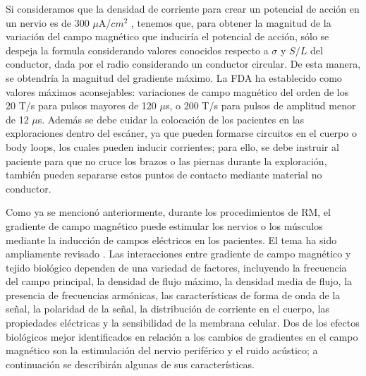 Si consideramos que la densidad de corriente para crear un potencial de acción en un nervio es de 300 $\mu$A/$cm^2$ \cite{Budinger_1983}, tenemos que, para obtener la magnitud de la variación del campo magnético que induciría el potencial de acción, sólo se despeja la formula considerando valores conocidos respecto a $\sigma$ y $S/L$ del conductor, dada por el radio considerando un conductor circular. De esta manera, se obtendría la magnitud del gradiente máximo. La FDA ha establecido como valores máximos aconsejables: variaciones de campo magnético del orden de los 20 T/s para pulsos mayores de 120 $\mu$s, o 200 T/s para pulsos de amplitud menor de 12 $\mu$s. Además se debe cuidar la colocación de los pacientes en las exploraciones dentro del escáner, ya que pueden formarse circuitos en el cuerpo o body loops, los cuales pueden inducir corrientes; para ello, se debe instruir al paciente para que no cruce los brazos o las piernas durante la exploración, también pueden separarse estos puntos de contacto mediante material no conductor.

Como ya se mencionó anteriormente, durante los procedimientos de RM, el gradiente de campo magnético puede estimular los nervios o los músculos mediante la inducción de campos eléctricos en los pacientes. El tema ha sido ampliamente revisado \cite{Nyenhuis_Bourland_Schaefer_1997,Bourland_Nyenhuis_Schaefer_1999}. Las interacciones entre gradiente de campo magnético y tejido biológico dependen de una variedad de factores, incluyendo la frecuencia del campo principal, la densidad de flujo máximo, la densidad media de flujo, la presencia de frecuencias armónicas, las características de forma de onda de la señal, la polaridad de la señal, la distribución de corriente en el cuerpo, las propiedades eléctricas y la sensibilidad de la membrana celular. Dos de los efectos biológicos mejor identificados en relación a los cambios de gradientes en el campo magnético son la estimulación del nervio periférico y el ruido acústico; a continuación se describirán algunas de sus características.

